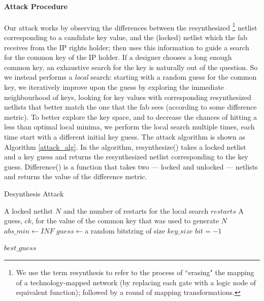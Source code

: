 \paragraph{Attack Procedure} Our attack works by observing the differences between the resynthesized \footnote{We use the term resynthesis to refer to the process of ``erasing" the mapping of a technology-mapped network (by replacing each gate with a logic node of equivalent function); followed by a round of mapping transformations.} netlist corresponding to a candidate key value, and the (locked) netlist which the fab receives from the IP rights holder; then uses this information to guide a search for the  common key of the IP holder. If a designer chooses a long enough common key, an exhaustive search for the key is naturally out of the question. So we instead performs a \emph{local} search: starting with a random guess for the common key, we iteratively improve upon the guess by exploring the immediate neighbourhood of keys, looking for key values with corresponding resynthesized netlists that better match the one that the fab sees (according to some difference metric). To better explore the key space, and to decrease the chances of hitting a less than optimal local minima, we perform the local search multiple times, each time start with a different initial key guess. The attack algorithm is shown as Algorithm \ref{attack_alg}. In the algorithm, resynthesize() takes a locked netlist and a key guess and returns the resynthesized netlist corresponding to the key guess. Difference() is a function that takes two --- locked and unlocked --- netlists and returns the value of the difference metric. 

\renewcommand{\algorithmicrequire}{\textbf{Input:}}
\renewcommand{\algorithmicensure}{\textbf{Output:}}

\begin{algorithm}
\caption{Desynthesis Attack}
\label{attack_alg}
\begin{algorithmic}
\REQUIRE A locked netlist $N$ and the number of restarts for the local search $restarts$
\ENSURE A guess, $ck$, for the value of the common key that was used to generate $N$
\STATE $abs\_min \leftarrow INF$
\STATE $guess \leftarrow $a random bitstring of size $key\_size$
\WHILE{\TRUE}
\STATE $bit=-1$

\ENDIF
{}
\ENDFOR
{}
\ELSE
{}
\ENDIF
\ENDWHILE
{}
\ENDIF
\ENDFOR
\RETURN $best\_guess$
\end{algorithmic}
\end{algorithm}

